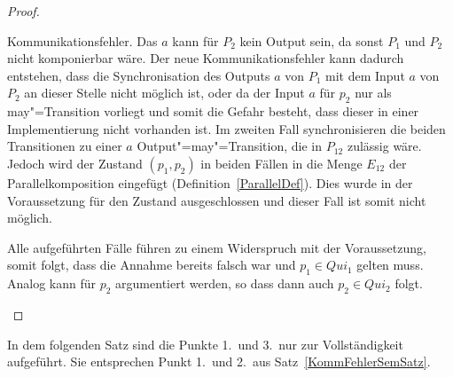 \begin{proof}
\begin{enumerate}
\begin{itemize}
          Kommunikationsfehler. Das $a$ kann für $P_2$ kein Output sein, da
          sonst $P_1$ und $P_2$ nicht komponierbar wäre. Der neue Kommunikationsfehler kann dadurch
          entstehen, dass die Synchronisation des Outputs $a$ von $P_1$ mit dem
          Input $a$ von $P_2$ an dieser Stelle nicht möglich ist, oder da der
          Input $a$ für $p_2$ nur als may"=Transition vorliegt und somit die
          Gefahr besteht, dass dieser in einer Implementierung nicht vorhanden
          ist. Im zweiten Fall synchronisieren die beiden Transitionen zu einer
          $a$ Output"=may"=Transition, die in $P_{12}$ zulässig wäre. Jedoch
          wird der Zustand $(p_1,p_2)$ in beiden Fällen in die Menge $E_{12}$
          der Parallelkomposition eingefügt (Definition~\ref{ParallelDef}).
          Dies wurde in der Voraussetzung für den Zustand ausgeschlossen und
          dieser Fall ist somit nicht möglich.
      \end{itemize}
      Alle aufgeführten Fälle führen zu einem Widerspruch mit der
      Voraussetzung, somit folgt, dass die Annahme bereits falsch war und
      $p_1\in Qui_1$ gelten muss. Analog kann für $p_2$ argumentiert werden, so
      dass dann auch $p_2\in Qui_2$ folgt.
  \end{enumerate}
\end{proof}

In dem folgenden Satz sind die Punkte 1.\ und 3.\ nur zur Vollständigkeit
aufgeführt. Sie entsprechen Punkt 1.\ und 2.\ aus Satz~\ref{KommFehlerSemSatz}.

